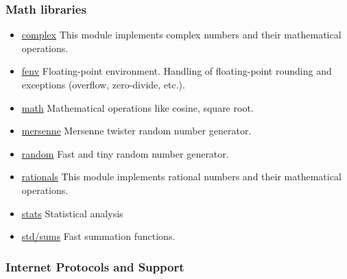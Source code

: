 \hypertarget{math-libraries}{%
\subsubsection{Math libraries}\label{math-libraries}}

\begin{itemize}
\tightlist
\item
  \href{complex.html}{complex} This module implements complex numbers
  and their mathematical operations.
\item
  \href{fenv.html}{fenv} Floating-point environment. Handling of
  floating-point rounding and exceptions (overflow, zero-divide, etc.).
\item
  \href{math.html}{math} Mathematical operations like cosine, square
  root.
\item
  \href{mersenne.html}{mersenne} Mersenne twister random number
  generator.
\item
  \href{random.html}{random} Fast and tiny random number generator.
\item
  \href{rationals.html}{rationals} This module implements rational
  numbers and their mathematical operations.
\item
  \href{stats.html}{stats} Statistical analysis
\item
  \href{sums.html}{std/sums} Fast summation functions.
\end{itemize}

\hypertarget{internet-protocols-and-support}{%
\subsubsection{Internet Protocols and
Support}\label{internet-protocols-and-support}}

